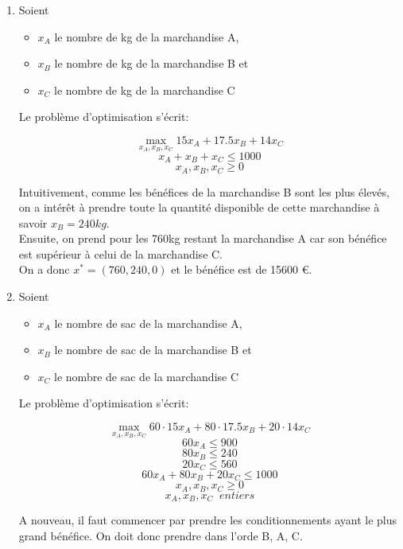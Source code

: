 \begin{enumerate}
    \begin{solution}
      \begin{enumerate}
        \item
          Soient
          \begin{itemize}
            \item $x_A$ le nombre de kg de la marchandise A,
            \item $x_B$ le nombre de kg de la marchandise B et
            \item $x_C$ le nombre de kg de la marchandise C
          \end{itemize}
          Le problème d'optimisation s'écrit:
          \begin{large}
            $$ \max_{x_A,x_B,x_C}
            {15x_A + 17.5x_B + 14x_C}
            $$
            $$x_A + x_B + x_C \leq 1000$$
            $$x_A, x_B, x_C \geq 0$$
          \end{large}
          Intuitivement, comme les bénéfices de la marchandise B sont les plus élevés, on a intérêt à prendre toute la quantité disponible de cette marchandise à savoir $x_B = 240kg$.\\
          Ensuite, on prend pour les 760kg restant la marchandise A car son bénéfice est supérieur à celui de la marchandise C. \\
          On a donc $x^{*} = (760, 240, 0)$ et le bénéfice est de 15600 \euro.
        \item
          Soient
          \begin{itemize}
            \item $x_A$ le nombre de sac de la marchandise A,
            \item $x_B$ le nombre de sac de la marchandise B et
            \item $x_C$ le nombre de sac de la marchandise C
          \end{itemize}
          Le problème d'optimisation s'écrit:
          \begin{large}
            $$ \max_{x_A,x_B,x_C}
            {60 \cdot 15x_A + 80 \cdot 17.5x_B + 20 \cdot 14x_C}
            $$
            $$60x_A \leq 900$$
            $$80x_B \leq 240$$
            $$20x_C \leq 560$$
            $$60x_A + 80x_B + 20x_C \leq 1000$$
            $$x_A, x_B, x_C \geq 0$$
            $$x_A, x_B, x_C \;\;entiers$$
          \end{large}
          A nouveau, il faut commencer par prendre les conditionnements ayant le plus grand bénéfice. On doit donc prendre dans l'orde B, A, C.


\end{enumerate}
\end{solution}
\end{enumerate}
